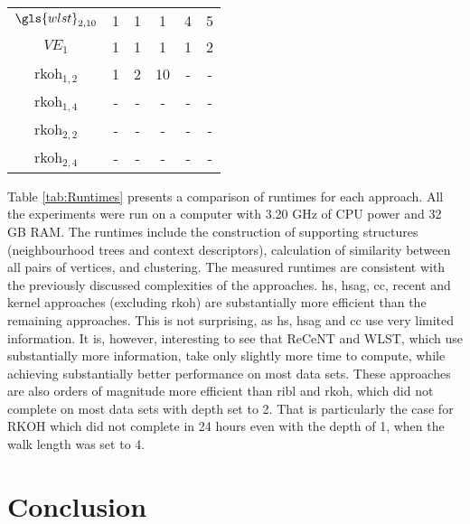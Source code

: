 \begin{table}
\begin{center}
\begin{tabular}[htb]{@{}cccccc@{}}
		$\gls{wlst}_{2,10}$	&	1		&	1	   &  	1	  &		4	   &   	5		\\

		$VE_1$			&	1		&	1	   &  	1	  &		1	   &   	2		\\

		\gls{rkoh}$_{1,2}$	&	1		&	2	   &  	10	  &	-		   &   -			\\

		\gls{rkoh}$_{1,4}$	&	-		&	-	   &  - 	  &  -	   &  - 		\\

		\gls{rkoh}$_{2,2}$	&	-		&	-	   &  - 	  &  -	   &  - 		\\

		\gls{rkoh}$_{2,4}$	&	-		&	-	   &  - 	  &  -	   &  - 		\\
		\bottomrule
		\end{tabular}

	\end{center}

\end{table}

Table \ref{tab:Runtimes} presents a comparison of runtimes for each approach.
All the experiments were run on a computer with 3.20 GHz of CPU power and 32 GB RAM.
The runtimes include the construction of supporting structures (neighbourhood trees and context descriptors), calculation of similarity between all pairs of vertices, and clustering.
The measured runtimes are consistent with the previously discussed complexities of the approaches.
\gls{hs}, \gls{hsag}, \gls{cc}, \gls{recent} and kernel approaches (excluding \gls{rkoh}) are substantially more efficient than the remaining approaches.
This is not surprising, as \gls{hs}, \gls{hsag} and \gls{cc}  use very limited information.
It is, however, interesting to see that ReCeNT and WLST,  which use substantially more information, take only slightly more time to compute, while achieving substantially better performance on most data sets.
These approaches are also orders of magnitude more efficient than \gls{ribl} and \gls{rkoh}, which did not complete on most data sets with depth set to 2.
That is particularly the case for RKOH which did not complete in 24 hours even with the depth of 1, when the walk length was set to 4.


\section{Conclusion}

